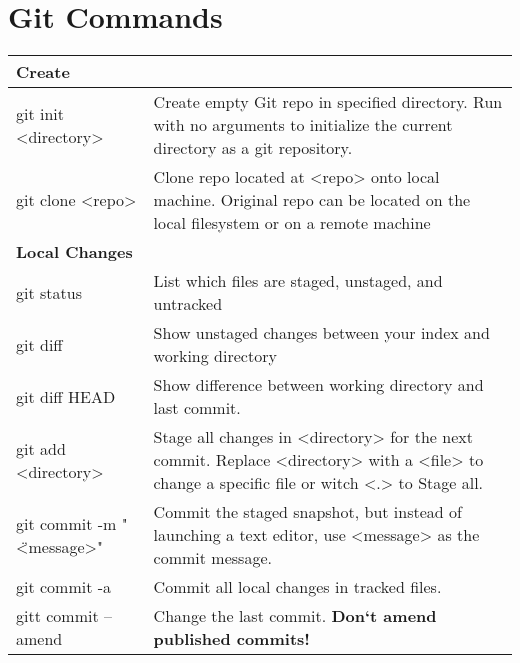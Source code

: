 \section{Git Commands}
\begin{longtable}{| p{} | p{} |}
    \hline 
    \textbf{Create}&
    \\ \hline
    
    git init <directory>&
    Create empty Git repo in specified directory.\newline
    Run with no arguments to initialize the current directory as a git repository.
    \\ \hline 
    
    git clone <repo>& 
    Clone repo located at <repo> onto local machine.\newline
    Original repo can be located on the local filesystem or on a remote machine
    \\ \hline  \hline
    
    \textbf{Local Changes}&
    \\ \hline 

    \hline 
    git status&
    List which files are staged, unstaged, and untracked  
    \\ \hline
    
    git diff& 
    Show unstaged changes between your index and working
    directory 
    \\ \hline 
    
    git diff HEAD&
    Show difference between working directory and last commit.
    \\ \hline
        
    git add <directory>&
    Stage all changes in <directory> for the next commit. Replace <directory>
    with a <file> to change a specific file or witch <.> to Stage all.
    \\ \hline 
    
    git commit -m " \" <message>"&
    Commit the staged snapshot, but instead of launching a text editor, use
    <message> as the commit message.
    \\ \hline
    
    git commit -a&
    Commit all local changes in tracked files.  
    \\ \hline 
    
    gitt commit --amend&
    Change the last commit. \textbf{Don‘t amend published commits!}
    \\ \hline \hline
    

\end{longtable}

